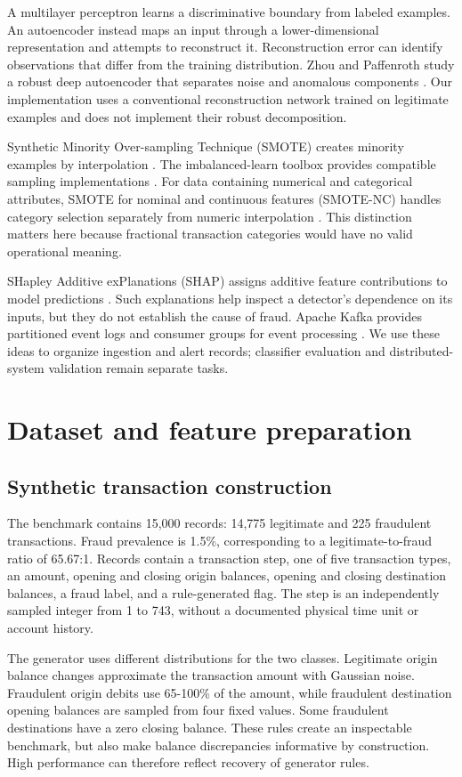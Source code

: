 \documentclass[conference]{IEEEtran}
\begin{document}
A multilayer perceptron learns a discriminative boundary from labeled examples. An autoencoder instead maps an input through a lower-dimensional representation and attempts to reconstruct it. Reconstruction error can identify observations that differ from the training distribution. Zhou and Paffenroth study a robust deep autoencoder that separates noise and anomalous components \cite{r5}. Our implementation uses a conventional reconstruction network trained on legitimate examples and does not implement their robust decomposition.

Synthetic Minority Over-sampling Technique (SMOTE) creates minority examples by interpolation \cite{r6}. The imbalanced-learn toolbox provides compatible sampling implementations \cite{r7}. For data containing numerical and categorical attributes, SMOTE for nominal and continuous features (SMOTE-NC) handles category selection separately from numeric interpolation \cite{r8}. This distinction matters here because fractional transaction categories would have no valid operational meaning.

SHapley Additive exPlanations (SHAP) assigns additive feature contributions to model predictions \cite{r9}. Such explanations help inspect a detector's dependence on its inputs, but they do not establish the cause of fraud. Apache Kafka provides partitioned event logs and consumer groups for event processing \cite{r10}. We use these ideas to organize ingestion and alert records; classifier evaluation and distributed-system validation remain separate tasks.

\section{Dataset and feature preparation}
\subsection{Synthetic transaction construction}
The benchmark contains 15,000 records: 14,775 legitimate and 225 fraudulent transactions. Fraud prevalence is 1.5\%, corresponding to a legitimate-to-fraud ratio of 65.67:1. Records contain a transaction step, one of five transaction types, an amount, opening and closing origin balances, opening and closing destination balances, a fraud label, and a rule-generated flag. The step is an independently sampled integer from 1 to 743, without a documented physical time unit or account history.

The generator uses different distributions for the two classes. Legitimate origin balance changes approximate the transaction amount with Gaussian noise. Fraudulent origin debits use 65-100\% of the amount, while fraudulent destination opening balances are sampled from four fixed values. Some fraudulent destinations have a zero closing balance. These rules create an inspectable benchmark, but also make balance discrepancies informative by construction. High performance can therefore reflect recovery of generator rules.
\end{document}
